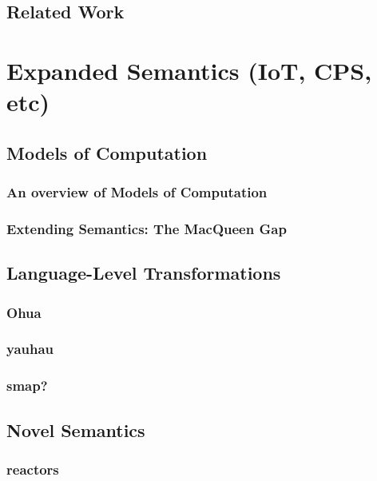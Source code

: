 \documentclass{report}
\begin{document}
\chapter{Related Work}



\part{Expanded Semantics (IoT, CPS, etc)}


\chapter{Models of Computation}

\section{An overview of Models of Computation}

\section{Extending Semantics: The MacQueen Gap} %

\chapter{Language-Level Transformations}
\section{Ohua}
 
\section{yauhau}
\section{smap?}



\chapter{Novel Semantics}

\section{reactors}
\end{document}

